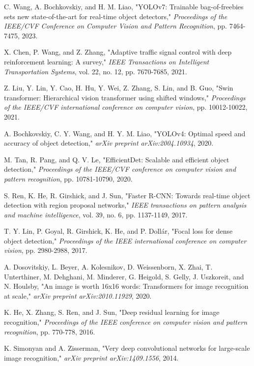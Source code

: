 \begin{thebibliography}{99}
C. Wang, A. Bochkovskiy, and H. M. Liao, "YOLOv7: Trainable bag-of-freebies sets new state-of-the-art for real-time object detectors," \textit{Proceedings of the IEEE/CVF Conference on Computer Vision and Pattern Recognition}, pp. 7464-7475, 2023.

X. Chen, P. Wang, and Z. Zhang, "Adaptive traffic signal control with deep reinforcement learning: A survey," \textit{IEEE Transactions on Intelligent Transportation Systems}, vol. 22, no. 12, pp. 7670-7685, 2021.

Z. Liu, Y. Lin, Y. Cao, H. Hu, Y. Wei, Z. Zhang, S. Lin, and B. Guo, "Swin transformer: Hierarchical vision transformer using shifted windows," \textit{Proceedings of the IEEE/CVF international conference on computer vision}, pp. 10012-10022, 2021.

A. Bochkovskiy, C. Y. Wang, and H. Y. M. Liao, "YOLOv4: Optimal speed and accuracy of object detection," \textit{arXiv preprint arXiv:2004.10934}, 2020.

M. Tan, R. Pang, and Q. V. Le, "EfficientDet: Scalable and efficient object detection," \textit{Proceedings of the IEEE/CVF conference on computer vision and pattern recognition}, pp. 10781-10790, 2020.

S. Ren, K. He, R. Girshick, and J. Sun, "Faster R-CNN: Towards real-time object detection with region proposal networks," \textit{IEEE transactions on pattern analysis and machine intelligence}, vol. 39, no. 6, pp. 1137-1149, 2017.

T. Y. Lin, P. Goyal, R. Girshick, K. He, and P. Dollár, "Focal loss for dense object detection," \textit{Proceedings of the IEEE international conference on computer vision}, pp. 2980-2988, 2017.

A. Dosovitskiy, L. Beyer, A. Kolesnikov, D. Weissenborn, X. Zhai, T. Unterthiner, M. Dehghani, M. Minderer, G. Heigold, S. Gelly, J. Uszkoreit, and N. Houlsby, "An image is worth 16x16 words: Transformers for image recognition at scale," \textit{arXiv preprint arXiv:2010.11929}, 2020.

K. He, X. Zhang, S. Ren, and J. Sun, "Deep residual learning for image recognition," \textit{Proceedings of the IEEE conference on computer vision and pattern recognition}, pp. 770-778, 2016.

K. Simonyan and A. Zisserman, "Very deep convolutional networks for large-scale image recognition," \textit{arXiv preprint arXiv:1409.1556}, 2014.


\end{thebibliography}
